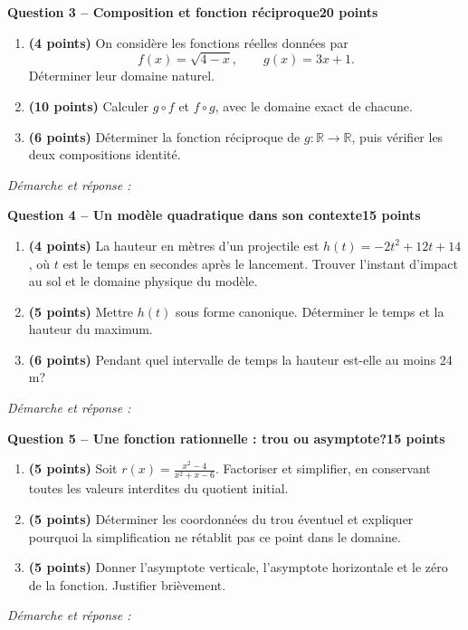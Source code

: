 \documentclass[11pt,a4paper]{article}
\begin{document}
\newpage
{\large\bfseries Question 3 -- Composition et fonction réciproque}\hfill\textbf{20 points}\par
\begin{enumerate}
\item \textbf{(4 points)} On considère les fonctions réelles données par \[f(x)=\sqrt{4-x},\qquad g(x)=3x+1.\] Déterminer leur domaine naturel.
\item \textbf{(10 points)} Calculer \(g\circ f\) et \(f\circ g\), avec le domaine exact de chacune.
\item \textbf{(6 points)} Déterminer la fonction réciproque de \(g:\mathbb R\to\mathbb R\), puis vérifier les deux compositions identité.
\end{enumerate}
\vspace{3mm}\textit{Démarche et réponse :}\par\vfill

\newpage
{\large\bfseries Question 4 -- Un modèle quadratique dans son contexte}\hfill\textbf{15 points}\par
\begin{enumerate}
\item \textbf{(4 points)} La hauteur en mètres d’un projectile est \(h(t)=-2t^2+12t+14\), où \(t\) est le temps en secondes après le lancement. Trouver l’instant d’impact au sol et le domaine physique du modèle.
\item \textbf{(5 points)} Mettre \(h(t)\) sous forme canonique. Déterminer le temps et la hauteur du maximum.
\item \textbf{(6 points)} Pendant quel intervalle de temps la hauteur est-elle au moins 24 m?
\end{enumerate}
\vspace{3mm}\textit{Démarche et réponse :}\par\vfill

\newpage
{\large\bfseries Question 5 -- Une fonction rationnelle : trou ou asymptote?}\hfill\textbf{15 points}\par
\begin{enumerate}
\item \textbf{(5 points)} Soit \(r(x)=\frac{x^2-4}{x^2+x-6}\). Factoriser et simplifier, en conservant toutes les valeurs interdites du quotient initial.
\item \textbf{(5 points)} Déterminer les coordonnées du trou éventuel et expliquer pourquoi la simplification ne rétablit pas ce point dans le domaine.
\item \textbf{(5 points)} Donner l’asymptote verticale, l’asymptote horizontale et le zéro de la fonction. Justifier brièvement.
\end{enumerate}
\vspace{3mm}\textit{Démarche et réponse :}\par\vfill
\end{document}
